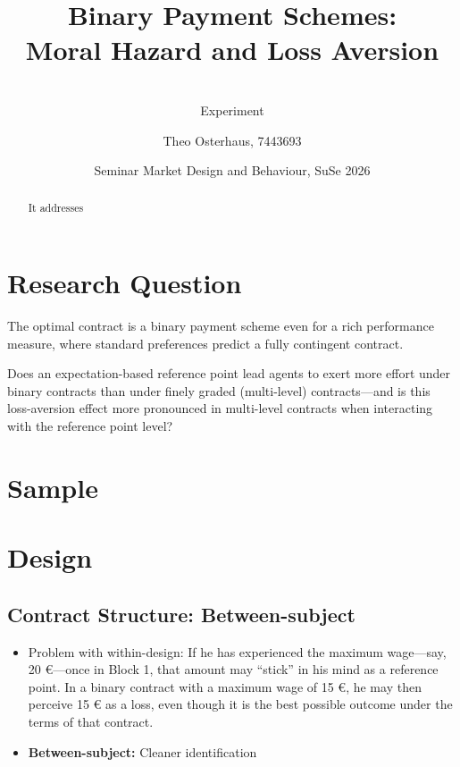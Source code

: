 \documentclass[
    11pt,
    a4paper,
    parskip=half,
    headings=normal
]{scrartcl}
\title{Binary Payment Schemes:\\[0.3em]
Moral Hazard and Loss Aversion}
\subtitle{\cite{Herweg2010}\\[0.3em]
Experiment}
\author{Theo Osterhaus, 7443693}
\date{Seminar Market Design and Behaviour, SuSe 2026}
\numberwithin{equation}{section}
\theoremstyle{definition}
\theoremstyle{remark}
\begin{document}
\maketitle

\begin{abstract}
\label{sec:abstract}

It addresses 

\end{abstract}

\tableofcontents

\newpage

\section{Research Question}
\label{sec:Research Question}

The optimal contract is a binary payment scheme even for a rich performance measure, where standard preferences predict a fully contingent contract.

Does an expectation-based reference point lead agents to exert more effort under binary contracts than under finely graded (multi-level) contracts—and is this loss-aversion effect more pronounced in multi-level contracts when interacting with the reference point level?

\section{Sample}

\section{Design}

\subsection{Contract Structure: Between-subject}

\begin{itemize}

    \item Problem with within-design: If he has experienced the maximum wage—say, 20 €—once in Block 1, that amount may “stick” in his mind as a reference point. In a binary contract with a maximum wage of 15 €, he may then perceive 15 € as a loss, even though it is the best possible outcome under the terms of that contract.

    \item \textbf{Between-subject:} Cleaner identification

\end{itemize}
\end{document}
